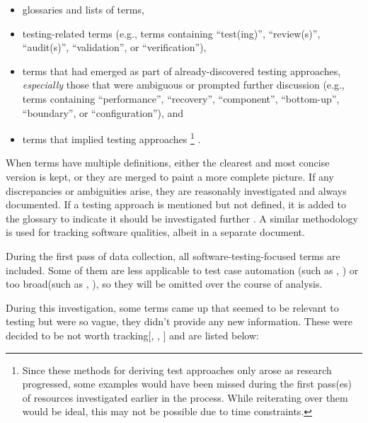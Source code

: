 \begin{itemize}
    \item glossaries and lists of terms,
    \item testing-related terms (e.g., terms containing ``test(ing)'',
          \ifnotpaper ``review(s)'', ``audit(s)'', \fi
          ``validation'', or ``verification''),
    \item terms that had emerged as part of already-discovered
          testing approaches, \emph{especially} those that were ambiguous
          or prompted further discussion (e.g., terms containing
          ``performance'', ``recovery'', ``component'', ``bottom-up'',
          \ifnotpaper ``boundary'', \fi or ``configuration''), and
    \item terms that implied testing approaches%
          \ifnotpaper\footnote{
                  Since these methods for deriving test approaches only arose
                  as research progressed, some examples would have been missed
                  during the first pass(es) of resources investigated earlier
                  in the process. While reiterating over them would be ideal,
                  this may not be possible due to time constraints.
              }\fi%
          .
\end{itemize}

When terms have multiple definitions, either the clearest and most concise
version is kept, or they are merged to paint a more complete picture.
If any discrepancies or ambiguities
arise, they are reasonably investigated and always documented. If a
testing approach is mentioned but not defined, it is added to the
glossary to indicate it should be investigated further%
. A similar methodology
is used for tracking software qualities, albeit in a separate
document.

During the first pass of data collection, all software-testing-focused terms
are included. Some of them are less applicable to test case automation
\ifnotpaper(such as , ) \fi or too
broad\ifnotpaper (such as , )\fi, so they
will be omitted over the course of analysis.

\ifnotpaper
    During this investigation, some terms came up that seemed to be relevant to
    testing but were so vague, they didn't provide any new information. These were
    decided to be not worth tracking[, ,
        ] and are listed below:

